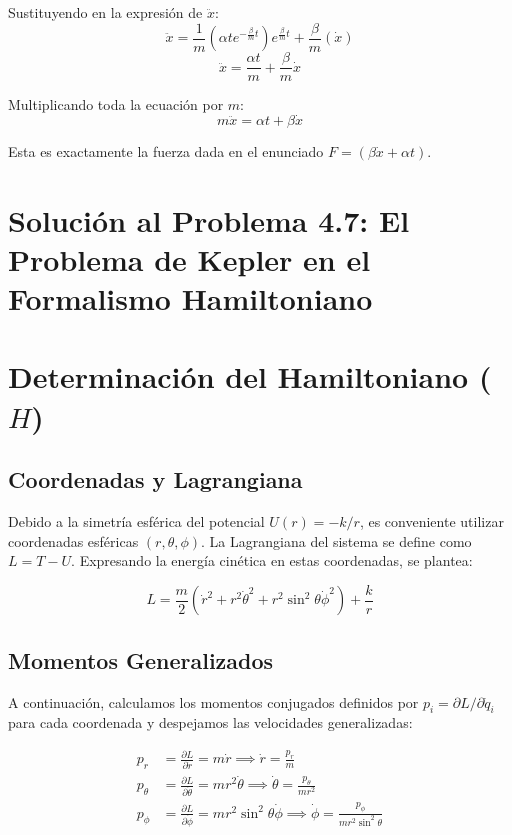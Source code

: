 \documentclass[12pt, a4paper]{article}
\begin{document}
Sustituyendo en la expresión de $\ddot{x}$:
\[
\ddot{x} = \frac{1}{m} (\alpha t e^{-\frac{\beta}{m}t}) e^{\frac{\beta}{m}t} + \frac{\beta}{m} (\dot{x})
\]
\[
\ddot{x} = \frac{\alpha t}{m} + \frac{\beta}{m} \dot{x}
\]

Multiplicando toda la ecuación por $m$:
\begin{equation}
    m\ddot{x} = \alpha t + \beta \dot{x}
\end{equation}

Esta es exactamente la fuerza dada en el enunciado $F = (\beta\dot{x} + \alpha t)$. 


\section{Solución al Problema 4.7: El Problema de Kepler en el Formalismo Hamiltoniano}


\section*{Determinación del Hamiltoniano ($H$)}

\subsection*{Coordenadas y Lagrangiana}

Debido a la simetría esférica del potencial $U(r) = -k/r$, es conveniente utilizar coordenadas esféricas $(r, \theta, \phi)$.
La Lagrangiana del sistema se define como $L = T - U$. Expresando la energía cinética en estas coordenadas, se plantea:

\begin{equation}
    L = \frac{m}{2}(\dot{r}^2 + r^2\dot{\theta}^2 + r^2\sin^2\theta\dot{\phi}^2) + \frac{k}{r}
\end{equation}

\subsection*{Momentos Generalizados}

A continuación, calculamos los momentos conjugados definidos por $p_i = \partial L / \partial \dot{q}_i$ para cada coordenada y despejamos las velocidades generalizadas:

\begin{align}
    p_r &= \frac{\partial L}{\partial \dot{r}} = m\dot{r} \implies \dot{r} = \frac{p_r}{m} \\
    p_\theta &= \frac{\partial L}{\partial \dot{\theta}} = mr^2\dot{\theta} \implies \dot{\theta} = \frac{p_\theta}{mr^2} \\
    p_\phi &= \frac{\partial L}{\partial \dot{\phi}} = mr^2\sin^2\theta\dot{\phi} \implies \dot{\phi} = \frac{p_\phi}{mr^2\sin^2\theta}
\end{align}
\end{document}
